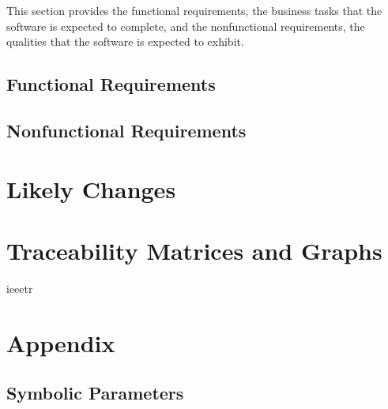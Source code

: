 \documentclass[12pt]{article}
\begin{document}
This section provides the functional requirements, the business tasks that the
software is expected to complete, and the nonfunctional requirements, the
qualities that the software is expected to exhibit.

\subsection{Functional Requirements}


\subsection{Nonfunctional Requirements}


\section{Likely Changes}    


\section{Traceability Matrices and Graphs}



\newpage

 {ieeetr}

\newpage

\section{Appendix}


\subsection{Symbolic Parameters}
\end{document}
